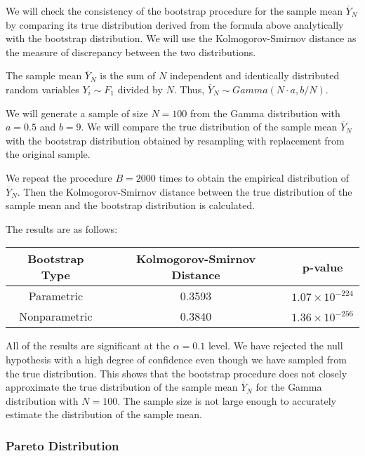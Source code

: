 \documentclass{article}
\begin{document}
We will check the consistency of the bootstrap procedure for the sample mean \(\overline{Y}_N\) by comparing its true distribution derived from the formula above analytically with the bootstrap distribution. We will use the Kolmogorov-Smirnov distance as the measure of discrepancy between the two distributions.

The sample mean \(\overline{Y}_N\) is the sum of \(N\) independent and identically distributed random variables \(Y_i \sim F_1\) divided by \(N\). Thus, \(\overline{Y}_N \sim Gamma(N \cdot a, b / N)\).

We will generate a sample of size \(N = 100\) from the Gamma distribution with \(a = 0.5\) and \(b = 9\). We will compare the true distribution of the sample mean \(\overline{Y}_N\) with the bootstrap distribution obtained by resampling with replacement from the original sample.

We repeat the procedure \(B = 2000\) times to obtain the empirical distribution of \(\overline{Y}_N\). Then the Kolmogorov-Smirnov distance between the true distribution of the sample mean and the bootstrap distribution is calculated.

The results are as follows:

\begin{table}[h]
\centering
\begin{tabular}{|c|c|c|}
\hline
\textbf{Bootstrap Type} & \textbf{Kolmogorov-Smirnov Distance} & \textbf{p-value} \\ \hline
Parametric & 0.3593 & \(1.07 \times 10^{-224}\) \\ \hline
Nonparametric & 0.3840 & \(1.36 \times 10^{-256}\) \\ \hline
\end{tabular}
\end{table}

All of the results are significant at the \(\alpha = 0.1\) level. We have rejected the null hypothesis with a high degree of confidence even though we have sampled from the true distribution. This shows that the bootstrap procedure does not closely approximate the true distribution of the sample mean \(\overline{Y}_N\) for the Gamma distribution with \(N = 100\). The sample size is not large enough to accurately estimate the distribution of the sample mean.

\subsubsection{Pareto Distribution}
\end{document}
